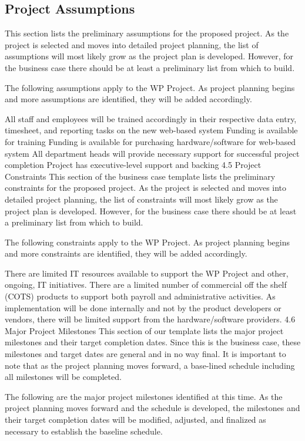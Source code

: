 \documentclass[11pt]{article}
\begin{document}
\subsection{Project Assumptions}
\label{sec:orgd32f7d5}
This section lists the preliminary assumptions for the proposed project. As the project is selected and moves into detailed project planning, the list of assumptions will most likely grow as the project plan is developed. However, for the business case there should be at least a preliminary list from which to build.

The following assumptions apply to the WP Project. As project planning begins and more assumptions are identified, they will be added accordingly.

All staff and employees will be trained accordingly in their respective data entry, timesheet, and reporting tasks on the new web-based system
Funding is available for training
Funding is available for purchasing hardware/software for web-based system
All department heads will provide necessary support for successful project completion
Project has executive-level support and backing
4.5 Project Constraints
This section of the business case template lists the preliminary constraints for the proposed project. As the project is selected and moves into detailed project planning, the list of constraints will most likely grow as the project plan is developed. However, for the business case there should be at least a preliminary list from which to build.

The following constraints apply to the WP Project. As project planning begins and more constraints are identified, they will be added accordingly.

There are limited IT resources available to support the WP Project and other, ongoing, IT initiatives.
There are a limited number of commercial off the shelf (COTS) products to support both payroll and administrative activities.
As implementation will be done internally and not by the product developers or vendors, there will be limited support from the hardware/software providers.
4.6 Major Project Milestones
This section of our template lists the major project milestones and their target completion dates. Since this is the business case, these milestones and target dates are general and in no way final. It is important to note that as the project planning moves forward, a base-lined schedule including all milestones will be completed.

The following are the major project milestones identified at this time. As the project planning moves forward and the schedule is developed, the milestones and their target completion dates will be modified, adjusted, and finalized as necessary to establish the baseline schedule.
\end{document}
